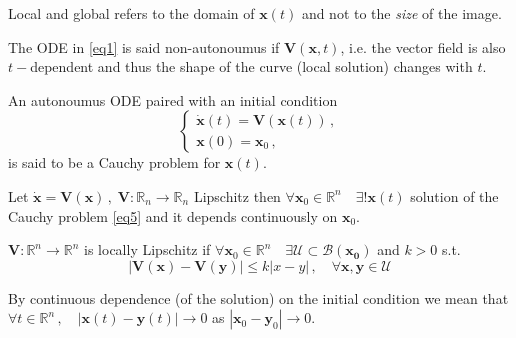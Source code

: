 \documentclass[../main.tex]{subfiles}
\begin{document}
\begin{remark*}
     Local and global refers to the domain of $\boldsymbol{x}(t)$ and not to the \textit{size} of the image.
\end{remark*}
\begin{remark*}
        The ODE in \ref{eq1} is said non-autonoumus if $\boldsymbol{V}(\boldsymbol{x},t)$, i.e. the vector field is also $t-$dependent and thus the shape of the curve (local solution) changes with $t$.
\end{remark*}
     \begin{definition}\label{def3}
          An autonoumus ODE paired with an initial condition
          \begin{equation}\label{eq5}
             \begin{cases}
                     \boldsymbol{\dot{x}}(t) = \boldsymbol{V}(\boldsymbol{x}(t)) \,, \\
                     \boldsymbol{x}(0) = \boldsymbol{x}_{0} \,, 
             \end{cases}
          \end{equation}
          is said to be a Cauchy problem for $\boldsymbol{x}(t)$.
     \end{definition}
     \begin{theorem}[label=thm1]{}{}
             Let $\boldsymbol{\dot{x}}=\boldsymbol{V}(\boldsymbol{x})\,,\; \boldsymbol{V}: \mathbb{R}_{n}\to \mathbb{R}_{n}$ Lipschitz then $\forall \boldsymbol{x}_{0}\in \mathbb{R}^{n}\quad \exists ! \boldsymbol{x}(t)$ solution of the Cauchy problem \ref{eq5} and it depends continuously on $\boldsymbol{x}_{0}$.
     \end{theorem}
\begin{remark*}
     $\boldsymbol{V}:\mathbb{R}^{n}\to \mathbb{R}^{n}$ is locally Lipschitz if $\forall \boldsymbol{x}_{0}\in \mathbb{R}^{n}\quad \exists \mathcal{U}\subset \mathcal{B}(\boldsymbol{x_{0}})$ and $k>0$ s.t.
     \begin{equation}\label{eq6}
          |\boldsymbol{V(x)}-\boldsymbol{V(y)}|\leq k|x-y|\,,\quad\forall \boldsymbol{x}, \boldsymbol{y}\in \mathcal{U}
     \end{equation}
\end{remark*}
\begin{remark*}
    By continuous dependence (of the solution) on the initial condition we mean that $\forall t \in \mathbb{R}^{n}\,,\quad |\boldsymbol{x}(t) - \boldsymbol{y}(t)|\to 0$ as $|\boldsymbol{x}_{0}-\boldsymbol{y}_{0}|\to 0$. 
\end{remark*}
\end{document}
